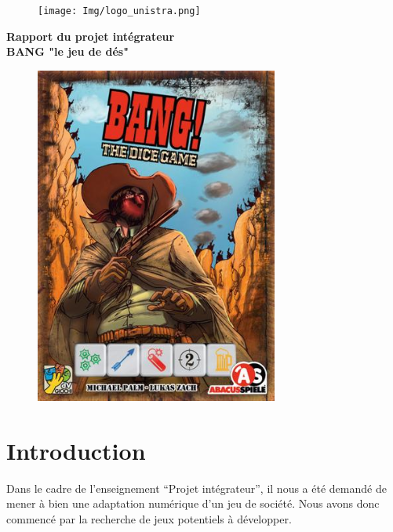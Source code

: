 \documentclass[a4paper,11pt]{article}
\begin{document}
\begin{titlepage}

  \begin{center}

    \begin{figure}[!htbp]
    \centering
    \texttt{[image: Img/logo\_unistra.png]}
    \end{figure}

    \Large{\textbf{Rapport du projet intégrateur}} \\
    \Large{\textbf{BANG "le jeu de dés"}} \\

    \begin{figure}[!htbp]
    \centering
    \includegraphics[width=8cm]{Img/image3.jpg}
    \end{figure}

  \end{center}

  \newpage

\end{titlepage}

\tableofcontents
\newpage


\section{Introduction}

    Dans le cadre de l’enseignement “Projet intégrateur”, il nous a été demandé de mener à bien une adaptation numérique d’un jeu de société. Nous avons donc commencé par la recherche de jeux potentiels à développer. \\
\end{document}
